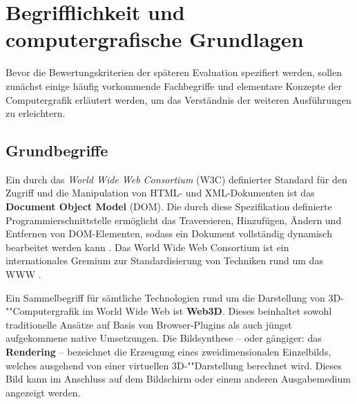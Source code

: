 \chapter{Begrifflichkeit und computergrafische Grundlagen}
\label{CHAP:FUNDAMENTALS}

Bevor die Bewertungskriterien der späteren Evaluation spezifiert werden, sollen zunächst einige häufig vorkommende Fachbegriffe und elementare Konzepte der Computergrafik erläutert werden, um das Verständnis der weiteren Ausführungen zu erleichtern.

\section{Grundbegriffe}
\label{SEC:BASIC_CONCEPTS}

Ein durch das \emph{World Wide Web Consortium} (W3C) definierter Standard für den Zugriff und die Manipulation von HTML- und XML-Dokumenten ist das \textbf{Document Object Model} (DOM). Die durch diese Spezifikation definierte Programmierschnittstelle ermöglicht das Traversieren, Hinzufügen, Ändern und Entfernen von DOM-Elementen, sodass ein Dokument vollständig dynamisch bearbeitet werden kann \autocite{W3C_DOM_CORE_3}. Das World Wide Web Consortium ist ein internationales Gremium zur Standardisierung von Techniken rund um das WWW \autocite{W3C_ABOUT}.

Ein Sammelbegriff für sämtliche Technologien rund um die Darstellung von 3D-""Computergrafik im World Wide Web ist \textbf{Web3D}. Dieses beinhaltet sowohl traditionelle Ansätze auf Basis von Browser-Plugins als auch jüngst aufgekommene native Umsetzungen.
Die Bildsynthese -- oder gängiger: das \textbf{Rendering} -- bezeichnet die Erzeugung eines zweidimensionalen Einzelbilds, welches ausgehend von einer virtuellen 3D-""Darstellung berechnet wird. Dieses Bild kann im Anschluss auf dem Bildschirm oder einem anderen Ausgabemedium angezeigt werden.

